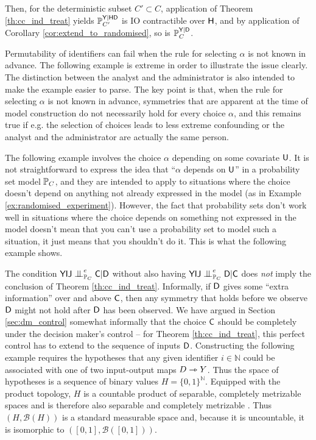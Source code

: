 \begin{example}
Then, for the deterministic subset $C'\subset C$, application of Theorem \ref{th:cc_ind_treat} yields $\mathbb{P}_{C'}^{\mathsf{Y}|\mathsf{HD}}$ is IO contractible over $\mathsf{H}$, and by application of Corollary \ref{cor:extend_to_randomised}, so is $\mathbb{P}_{C}^{\mathsf{Y}|\mathsf{D}}$.
\end{example}

Permutability of identifiers can fail when the rule for selecting $\alpha$ is not known in advance. The following example is extreme in order to illustrate the issue clearly. The distinction between the analyst and the administrator is also intended to make the example easier to parse. The key point is that, when the rule for selecting $\alpha$ is not known in advance, symmetries that are apparent at the time of model construction do not necessarily hold for every choice $\alpha$, and this remains true if e.g. the selection of choices leads to less extreme confounding or the analyst and the administrator are actually the same person.

The following example involves the choice $\alpha$ depending on some covariate $\mathsf{U}$. It is not straightforward to express the idea that ``$\alpha$ depends on $\mathsf{U}$'' in a probability set model $\mathbb{P}_C$, and they are intended to apply to situations where the choice doesn't depend on anything not already expressed in the model (as in Example \ref{ex:randomised_experiment}). However, the fact that probability sets don't work well in situations where the choice depends on something not expressed in the model doesn't mean that you can't use a probability set to model such a situation, it just means that you shouldn't do it. This is what the following example shows.

The condition $\RV{YIJ}\CI^e_{\prob{P}_C} \RV{C}|\RV{D}$ without also having $\RV{YIJ}\CI^e_{\prob{P}_C} \RV{D}|\RV{C}$ does \emph{not} imply the conclusion of Theorem \ref{th:cc_ind_treat}. Informally, if $\mathsf{D}$ gives some ``extra information'' over and above $\mathsf{C}$, then any symmetry that holds before we observe $\mathsf{D}$ might not hold after $\mathsf{D}$ has been observed. We have argued in Section \ref{sec:dm_control} somewhat informally that the choice $\mathsf{C}$ should be completely under the decision maker's control -- for Theorem \ref{th:cc_ind_treat}, this perfect control has to extend to the sequence of inputs $\mathsf{D}$. Constructing the following example requires the hypotheses that any given identifier $i\in\mathbb{N}$ could be associated with one of two input-output maps $D\rightarrowtriangle Y$. Thus the space of hypotheses is a sequence of binary values $H=\{0,1\}^{\mathbb{N}}$. Equipped with the product topology, $H$ is a countable product of separable, completely metrizable spaces and is therefore also separable and completely metrizable \citep[Thm. 16.4,Thm. 24.11]{willard_general_1970}. Thus $(H,\mathcal{B}(H))$ is a standard measurable space and, because it is uncountable, it is isomorphic to $([0,1],\mathcal{B}([0,1]))$.

